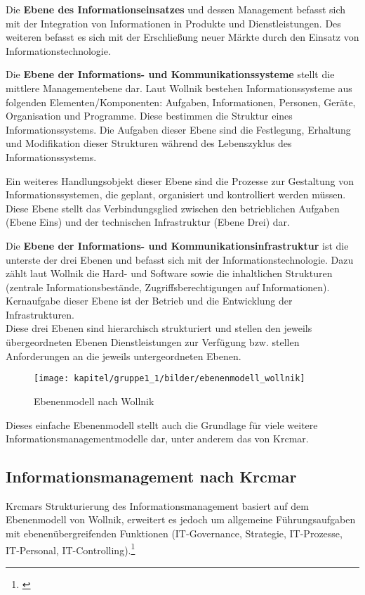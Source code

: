 Die \textbf{Ebene des Informationseinsatzes} und dessen Management befasst sich mit der Integration von Informationen in Produkte und Dienstleistungen. Des weiteren befasst es sich mit der Erschließung neuer Märkte durch den Einsatz von Informationstechnologie.

Die \textbf{Ebene der Informations- und Kommunikationssysteme} stellt die mittlere Managementebene dar. Laut Wollnik bestehen Informationssysteme aus folgenden Elementen/Komponenten: Aufgaben, Informationen, Personen, Geräte, Organisation und Programme. Diese bestimmen die Struktur eines Informationssystems. Die Aufgaben dieser Ebene sind die Festlegung, Erhaltung und Modifikation dieser Strukturen während des Lebenszyklus des Informationssystems.

Ein weiteres Handlungsobjekt dieser Ebene sind die Prozesse zur Gestaltung von Informationssystemen, die geplant, organisiert und kontrolliert werden müssen. Diese Ebene stellt das Verbindungsglied zwischen den betrieblichen Aufgaben (Ebene Eins) und der technischen Infrastruktur (Ebene Drei) dar.

Die \textbf{Ebene der Informations- und Kommunikationsinfrastruktur} ist die unterste der drei Ebenen 
und befasst sich mit der Informationstechnologie. 
Dazu zählt laut Wollnik die Hard- und Software sowie die inhaltlichen Strukturen (zentrale Informationsbestände, Zugriffsberechtigungen auf Informationen). Kernaufgabe dieser Ebene ist der Betrieb und die Entwicklung der Infrastrukturen.\\

Diese drei Ebenen sind hierarchisch strukturiert und stellen den jeweils übergeordneten Ebenen Dienstleistungen zur Verfügung bzw. stellen Anforderungen an die jeweils untergeordneten Ebenen. 

\begin{figure}[h!]
	\centering
	\texttt{[image: kapitel/gruppe1\_1/bilder/ebenenmodell\_wollnik]}
	\caption{Ebenenmodell nach Wollnik}
	\label{fig_ebenenmodell_wollnik}
\end{figure}

Dieses einfache Ebenenmodell stellt auch die Grundlage für viele weitere Informationsmanagementmodelle dar, unter anderem das von Krcmar.

\subsection{Informationsmanagement nach Krcmar}
Krcmars Strukturierung des Informationsmanagement basiert auf dem Ebenenmodell von Wollnik, erweitert es jedoch um allgemeine Führungsaufgaben mit ebenenübergreifenden Funktionen (IT-Governance, Strategie, IT-Prozesse, IT-Personal, IT-Controlling).\footnote{\cite{krcmar_informationsmanagement_2015}}

